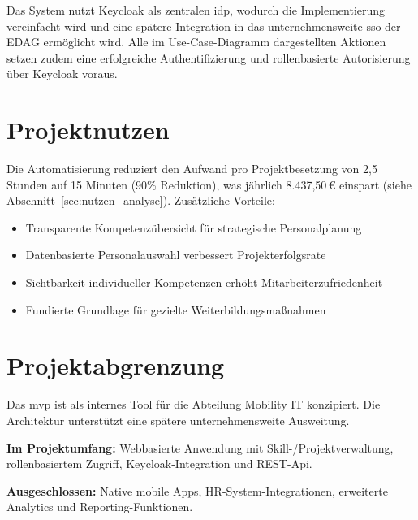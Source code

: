 Das System nutzt Keycloak\cite{keycloak_docs} als zentralen \gls{idp}, wodurch die Implementierung vereinfacht wird und eine spätere Integration in das unternehmensweite \gls{sso} der EDAG ermöglicht wird. Alle im Use-Case-Diagramm dargestellten Aktionen setzen zudem eine erfolgreiche Authentifizierung und rollenbasierte Autorisierung über Keycloak\cite{keycloak_docs} voraus.

\section{Projektnutzen}

Die Automatisierung reduziert den Aufwand pro Projektbesetzung von 2,5 Stunden auf 15 Minuten (90\% Reduktion), was jährlich 8.437,50\,€ einspart (siehe Abschnitt~\ref{sec:nutzen_analyse})\cite{projektbesetzung_aufwand,projektleiter_stundensatz}. Zusätzliche Vorteile:

\begin{itemize}[noitemsep]
    \item Transparente Kompetenzübersicht für strategische Personalplanung
    \item Datenbasierte Personalauswahl verbessert Projekterfolgsrate
    \item Sichtbarkeit individueller Kompetenzen erhöht Mitarbeiterzufriedenheit
    \item Fundierte Grundlage für gezielte Weiterbildungsmaßnahmen
\end{itemize}

\section{Projektabgrenzung}

Das \gls{mvp} ist als internes Tool für die Abteilung Mobility IT konzipiert. Die Architektur unterstützt eine spätere unternehmensweite Ausweitung.

\textbf{Im Projektumfang:} Webbasierte Anwendung mit Skill-/Projektverwaltung, rollenbasiertem Zugriff, Keycloak-Integration und REST-Api.

\textbf{Ausgeschlossen:} Native mobile Apps, HR-System-Integrationen, erweiterte Analytics und Reporting-Funktionen.
